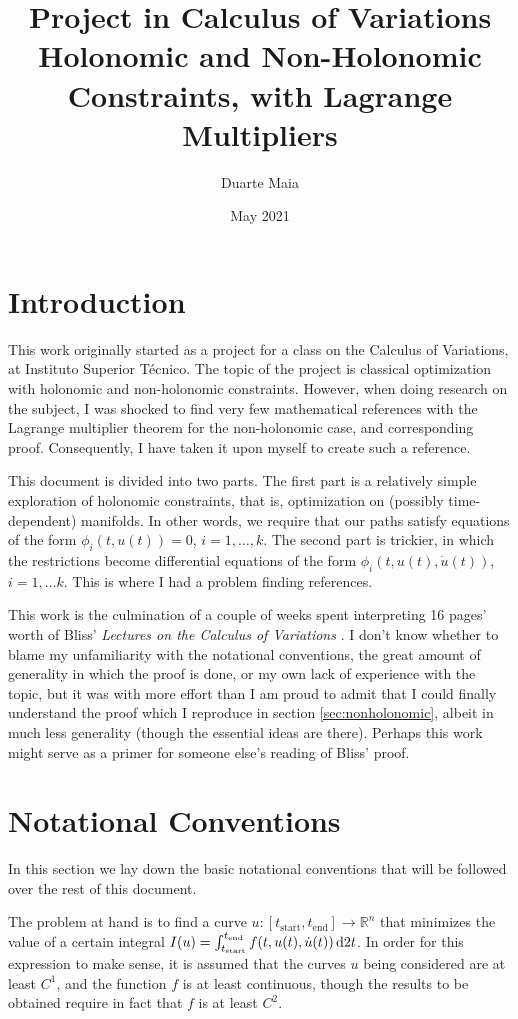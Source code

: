 \documentclass{article}
\title{Project in Calculus of Variations\\
\large Holonomic and Non-Holonomic Constraints, with Lagrange Multipliers}
\author{Duarte Maia}
\date{May 2021}
\theoremstyle{plain}
\theoremstyle{plain}
\theoremstyle{nonumberplain}
\theoremstyle{empty}
\newcommand{\R}{\mathbb{R}}
\newcommand{\tstart}{\mathrm{start}}
\newcommand{\tend}{\mathrm{end}}
\begin{document}
\maketitle

\section{Introduction}

This work originally started as a project for a class on the Calculus of Variations, at Instituto Superior Técnico. The topic of the project is classical optimization with holonomic and non-holonomic constraints. However, when doing research on the subject, I was shocked to find very few mathematical references with the Lagrange multiplier theorem for the non-holonomic case, and corresponding proof. Consequently, I have taken it upon myself to create such a reference.

This document is divided into two parts. The first part is a relatively simple exploration of holonomic constraints, that is, optimization on (possibly time-dependent) manifolds. In other words, we require that our paths satisfy equations of the form $\phi_i(t, u(t)) = 0$, $i = 1, \dots, k$. The second part is trickier, in which the restrictions become differential equations of the form $\phi_i(t,u(t), \dot u(t))$, $i = 1, \dots k$. This is where I had a problem finding references.

This work is the culmination of a couple of weeks spent interpreting 16 pages' worth of Bliss' \textit{Lectures on the Calculus of Variations} \cite[pp.~187-202]{bliss}. I don't know whether to blame my unfamiliarity with the notational conventions, the great amount of generality in which the proof is done, or my own lack of experience with the topic, but it was with more effort than I am proud to admit that I could finally understand the proof which I reproduce in section \ref{sec:nonholonomic}, albeit in much less generality (though the essential ideas are there). Perhaps this work might serve as a primer for someone else's reading of Bliss' proof.

\section{Notational Conventions}

In this section we lay down the basic notational conventions that will be followed over the rest of this document.

The problem at hand is to find a curve $u \colon [t_\tstart, t_\tend] \to \R^n$ that minimizes the value of a certain integral $I(u) = \int_{t_\tstart}^{t_\tend} f(t, u(t), \dot u(t)) \dl2 t$. In order for this expression to make sense, it is assumed that the curves $u$ being considered are at least $C^1$, and the function $f$ is at least continuous, though the results to be obtained require in fact that $f$ is at least $C^2$.
\end{document}

